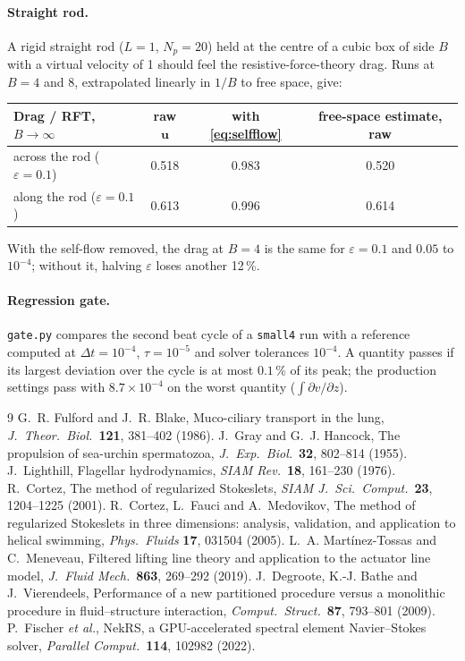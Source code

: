 \documentclass[10pt,a4paper]{article}
\newcommand{\vect}[1]{\bm{#1}}
\newcommand{\eps}{\varepsilon}
\newcommand{\code}[1]{\texttt{#1}}
\begin{document}
\paragraph{Straight rod.}
A rigid straight rod ($L = 1$, $N_p = 20$) held at the centre of a cubic box of side $B$ with a virtual velocity of 1 should feel the resistive-force-theory drag.
Runs at $B = 4$ and $8$, extrapolated linearly in $1/B$ to free space, give:
\begin{center}
  \small
  \begin{tabular}{@{}lccc@{}}
    \toprule
    Drag / RFT, $B\to\infty$ & raw $\vect u$ & with \eqref{eq:selfflow} & free-space estimate, raw \\
    \midrule
    across the rod ($\eps = 0.1$) & 0.518 & 0.983 & 0.520 \\
    along the rod ($\eps = 0.1$)  & 0.613 & 0.996 & 0.614 \\
    \bottomrule
  \end{tabular}
\end{center}
With the self-flow removed, the drag at $B = 4$ is the same for $\eps = 0.1$ and $0.05$ to $10^{-4}$; without it, halving $\eps$ loses another 12\,\%.

\paragraph{Regression gate.}
\code{gate.py} compares the second beat cycle of a \code{small4} run with a reference computed at $\Delta t = 10^{-4}$, $\tau = 10^{-5}$ and solver tolerances $10^{-4}$.
A quantity passes if its largest deviation over the cycle is at most $0.1\,\%$ of its peak; the production settings pass with $8.7\times10^{-4}$ on the worst quantity ($\int\partial v/\partial z$).

\begin{thebibliography}{9}\small
{}
G.~R. Fulford and J.~R. Blake, Muco-ciliary transport in the lung, \emph{J.\ Theor.\ Biol.}\ \textbf{121}, 381--402 (1986).
J.~Gray and G.~J. Hancock, The propulsion of sea-urchin spermatozoa, \emph{J.\ Exp.\ Biol.}\ \textbf{32}, 802--814 (1955).
J.~Lighthill, Flagellar hydrodynamics, \emph{SIAM Rev.}\ \textbf{18}, 161--230 (1976).
R.~Cortez, The method of regularized Stokeslets, \emph{SIAM J.\ Sci.\ Comput.}\ \textbf{23}, 1204--1225 (2001).
R.~Cortez, L.~Fauci and A.~Medovikov, The method of regularized Stokeslets in three dimensions: analysis, validation, and application to helical swimming, \emph{Phys.\ Fluids} \textbf{17}, 031504 (2005).
L.~A. Mart\'inez-Tossas and C.~Meneveau, Filtered lifting line theory and application to the actuator line model, \emph{J.\ Fluid Mech.}\ \textbf{863}, 269--292 (2019).
J.~Degroote, K.-J. Bathe and J.~Vierendeels, Performance of a new partitioned procedure versus a monolithic procedure in fluid--structure interaction, \emph{Comput.\ Struct.}\ \textbf{87}, 793--801 (2009).
P.~Fischer \emph{et al.}, NekRS, a GPU-accelerated spectral element Navier--Stokes solver, \emph{Parallel Comput.}\ \textbf{114}, 102982 (2022).
\end{thebibliography}
\end{document}
